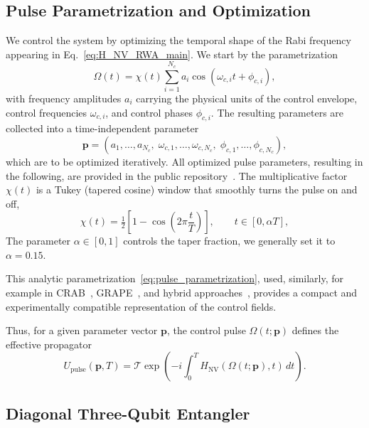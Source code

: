 \subsection{Pulse Parametrization and Optimization}
\label{sec:pulse_parametrization} 
We control the system by optimizing the temporal shape of the Rabi frequency appearing in Eq.~\eqref{eq:H_NV_RWA_main}. We start by the parametrization 
\begin{equation}
\Omega(t) = \chi(t)\sum_{i=1}^{N_c} a_{i} \cos(\omega_{c,i} t + \phi_{c,i}),
\label{eq:pulse_parametrization}
\end{equation}
with frequency amplitudes $a_{i}$ carrying the physical units of the control envelope, control frequencies $\omega_{c,i}$, and control phases $\phi_{c,i}$.
The resulting parameters are collected into a time-independent parameter 
\begin{equation}
\mathbf p =
(a_{1},\ldots,a_{N_c},\;
\omega_{c,1},\ldots,\omega_{c,N_c},\;
\phi_{c,1},\ldots,\phi_{c,N_c}),
\label{eq:pulse_parametrization_example}
\end{equation}
which are to be optimized iteratively. All optimized pulse parameters, resulting in the following, are provided in the public repository~\cite{baran2026_multiqubit_control}.
The multiplicative factor $\chi(t)$ is a Tukey (tapered cosine) window that smoothly turns the pulse on and off,
\begin{equation}
\chi(t)=\tfrac12\left[1-\cos\!\left(2\pi\frac{t}{T}\right)\right], 
\qquad t\in[0,\alpha T],
\end{equation}
The parameter $\alpha\in[0,1]$ controls the taper fraction, we generally set it to $\alpha=0.15$.

\noindent
This analytic parametrization~\eqref{eq:pulse_parametrization}, used, similarly, for example in CRAB~\cite{caneva2011chopped,rach2015dressing}, GRAPE~\cite{khaneja2005optimal,de2011second}, and hybrid approaches~\cite{motzoi2011optimal,sorensen2018quantum,sorensen2020optimization,preti2022continuous}, provides a compact and experimentally compatible representation of the control fields. 


Thus, for a given parameter vector $\mathbf p$, the control pulse
$\Omega(t;\mathbf p)$ defines the effective propagator
\begin{equation}
U_{\mathrm{pulse}}(\mathbf p,T)
=
\mathcal{T}
\exp\!\left(
-i\int_0^T
H_{\mathrm{NV}}(\Omega(t;\mathbf p),t)\,dt
\right).
\label{eq:U_pulse_definition}
\end{equation}





\subsection{Diagonal Three-Qubit Entangler}
\label{sec:results_nv_ccz}
